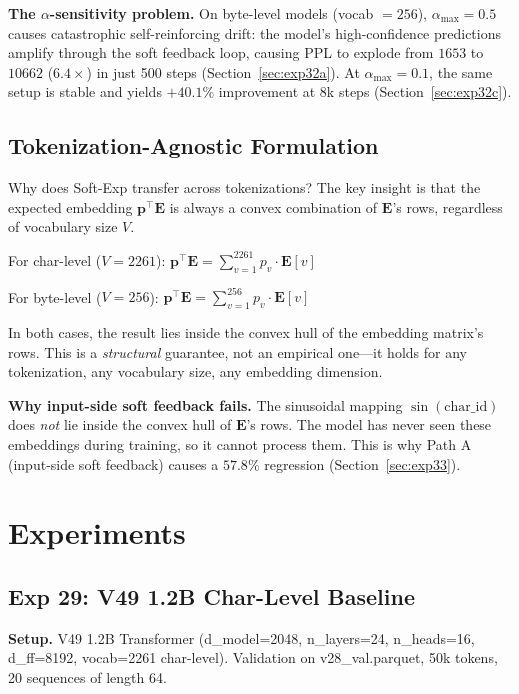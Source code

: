 \documentclass[11pt]{article}
\begin{document}
\textbf{The $\alpha$-sensitivity problem.} On byte-level models (vocab $= 256$), $\alpha_{\max} = 0.5$ causes catastrophic self-reinforcing drift: the model's high-confidence predictions amplify through the soft feedback loop, causing PPL to explode from $1653$ to $10662$ ($6.4\times$) in just 500 steps (Section~\ref{sec:exp32a}). At $\alpha_{\max} = 0.1$, the same setup is stable and yields $+40.1\%$ improvement at 8k steps (Section~\ref{sec:exp32c}).

\subsection{Tokenization-Agnostic Formulation}
\label{sec:method_agnostic}

Why does Soft-Exp transfer across tokenizations? The key insight is that the expected embedding $\mathbf{p}^\top \mathbf{E}$ is always a convex combination of $\mathbf{E}$'s rows, regardless of vocabulary size $V$.

For char-level ($V = 2261$): $\mathbf{p}^\top \mathbf{E} = \sum_{v=1}^{2261} p_v \cdot \mathbf{E}[v]$

For byte-level ($V = 256$): $\mathbf{p}^\top \mathbf{E} = \sum_{v=1}^{256} p_v \cdot \mathbf{E}[v]$

In both cases, the result lies inside the convex hull of the embedding matrix's rows. This is a \emph{structural} guarantee, not an empirical one—it holds for any tokenization, any vocabulary size, any embedding dimension.

\textbf{Why input-side soft feedback fails.} The sinusoidal mapping $\sin(\text{char\_id})$ does \emph{not} lie inside the convex hull of $\mathbf{E}$'s rows. The model has never seen these embeddings during training, so it cannot process them. This is why Path A (input-side soft feedback) causes a $57.8\%$ regression (Section~\ref{sec:exp33}).

\section{Experiments}
\label{sec:experiments}

\subsection{Exp 29: V49 1.2B Char-Level Baseline}
\label{sec:exp29}

\textbf{Setup.} V49 1.2B Transformer (d\_model=2048, n\_layers=24, n\_heads=16, d\_ff=8192, vocab=2261 char-level). Validation on v28\_val.parquet, 50k tokens, 20 sequences of length 64.
\end{document}
